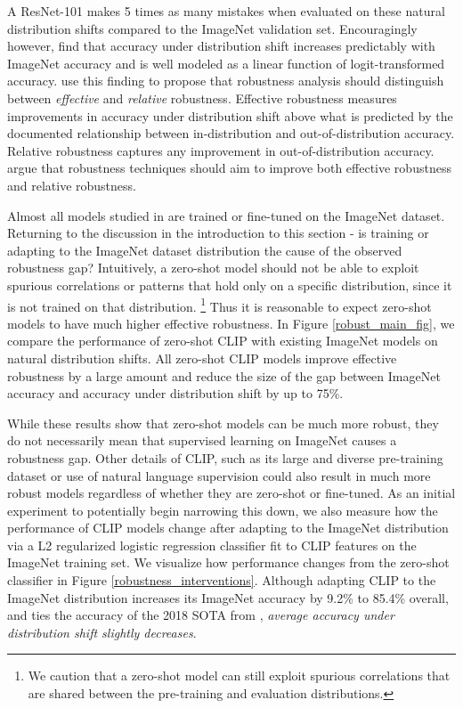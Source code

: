 A ResNet-101 makes 5 times as many mistakes when evaluated on these natural distribution shifts compared to the ImageNet validation set. Encouragingly however, \citet{taori2020measuring} find that accuracy under distribution shift increases predictably with ImageNet accuracy and is well modeled as a linear function of logit-transformed accuracy. \citet{taori2020measuring} use this finding to propose that robustness analysis should distinguish between \textit{effective} and \textit{relative} robustness. Effective robustness measures improvements in accuracy under distribution shift above what is predicted by the documented relationship between in-distribution and out-of-distribution accuracy. Relative robustness captures any improvement in out-of-distribution accuracy. \citet{taori2020measuring} argue that robustness techniques should aim to improve both effective robustness and relative robustness.

Almost all models studied in \citet{taori2020measuring} are trained or fine-tuned on the ImageNet dataset. Returning to the discussion in the introduction to this section - is training or adapting to the ImageNet dataset distribution the cause of the observed robustness gap? Intuitively, a zero-shot model should not be able to exploit spurious correlations or patterns that hold only on a specific distribution, since it is not trained on that distribution. \footnote{We caution that a zero-shot model can still exploit spurious correlations that are shared between the pre-training and evaluation distributions.} Thus it is reasonable to expect zero-shot models to have much higher effective robustness. In Figure \ref{robust_main_fig}, we compare the performance of zero-shot CLIP with existing ImageNet models on natural distribution shifts. All zero-shot CLIP models improve effective robustness by a large amount and reduce the size of the gap between ImageNet accuracy and accuracy under distribution shift by up to 75\%.

While these results show that zero-shot models can be much more robust, they do not necessarily mean that supervised learning on ImageNet causes a robustness gap. Other details of CLIP, such as its large and diverse pre-training dataset or use of natural language supervision could also result in much more robust models regardless of whether they are zero-shot or fine-tuned. As an initial experiment to potentially begin narrowing this down, we also measure how the performance of CLIP models change after adapting to the ImageNet distribution via a L2 regularized logistic regression classifier fit to CLIP features on the ImageNet training set. We visualize how performance changes from the zero-shot classifier in Figure \ref{robustness_interventions}. Although adapting CLIP to the ImageNet distribution increases its ImageNet accuracy by 9.2\% to 85.4\% overall, and ties the accuracy of the 2018 SOTA from \citet{mahajan2018exploring}, \textit{average accuracy under distribution shift slightly decreases}.

